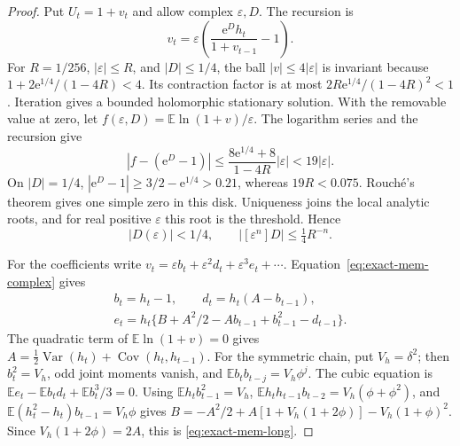 \begin{proof}
Put $U_t=1+v_t$ and allow complex $\varepsilon,D$. The recursion is
\begin{equation}
 v_t=\varepsilon\left(\frac{\mathrm{e}^D h_t}{1+v_{t-1}}-1\right).
 \label{eq:exact-mem-complex}
\end{equation}
For $R=1/256$, $|\varepsilon|\leq R$, and $|D|\leq1/4$, the ball
$|v|\leq4|\varepsilon|$ is invariant because
$1+2\mathrm{e}^{1/4}/(1-4R)<4$. Its contraction factor is at most
$2R\mathrm{e}^{1/4}/(1-4R)^2<1$. Iteration gives a bounded holomorphic
stationary solution. With the removable value at zero, let
$f(\varepsilon,D)=\mathbb E\ln(1+v)/\varepsilon$.
The logarithm series and the recursion give
\begin{equation}
 |f-(\mathrm{e}^D-1)|
 \leq\frac{8\mathrm{e}^{1/4}+8}{1-4R}|\varepsilon|
 <19|\varepsilon|.
 \label{eq:exact-mem-rouche}
\end{equation}
On $|D|=1/4$, $|\mathrm{e}^D-1|\geq3/2-\mathrm{e}^{1/4}>0.21$,
whereas $19R<0.075$. Rouch\'e's theorem gives one simple zero in this
disk. Uniqueness joins the local analytic roots, and for real positive
$\varepsilon$ this root is the threshold. Hence
\begin{equation}
 |D(\varepsilon)|<1/4,\qquad
 |[\varepsilon^n]D|\leq\tfrac14 R^{-n}.
 \label{eq:exact-mem-cauchy}
\end{equation}

For the coefficients write
$v_t=\varepsilon b_t+\varepsilon^2d_t+\varepsilon^3e_t+\cdots$.
Equation~\eqref{eq:exact-mem-complex} gives
\begin{equation}
\begin{gathered}
 b_t=h_t-1,\qquad d_t=h_t(A-b_{t-1}),\\
 e_t=h_t\{B+A^2/2-A b_{t-1}+b_{t-1}^2-d_{t-1}\}.
 \label{eq:exact-mem-long-recursion}
\end{gathered}
\end{equation}
The quadratic term of $\mathbb E\ln(1+v)=0$ gives
$A=\tfrac12\operatorname{Var}(h_t)+\operatorname{Cov}(h_t,h_{t-1})$.
For the symmetric chain, put $V_h=\delta^2$; then $b_t^2=V_h$,
odd joint moments vanish, and $\mathbb E b_tb_{t-j}=V_h\phi^j$.
The cubic equation is
$\mathbb E e_t-\mathbb E b_td_t+\mathbb E b_t^3/3=0$.
Using
$\mathbb E h_tb_{t-1}^2=V_h$,
$\mathbb E h_th_{t-1}b_{t-2}=V_h(\phi+\phi^2)$, and
$\mathbb E(h_t^2-h_t)b_{t-1}=V_h\phi$ gives
$B=-A^2/2+A[1+V_h(1+2\phi)]-V_h(1+\phi)^2$.
Since $V_h(1+2\phi)=2A$, this is \eqref{eq:exact-mem-long}.


\end{proof}
